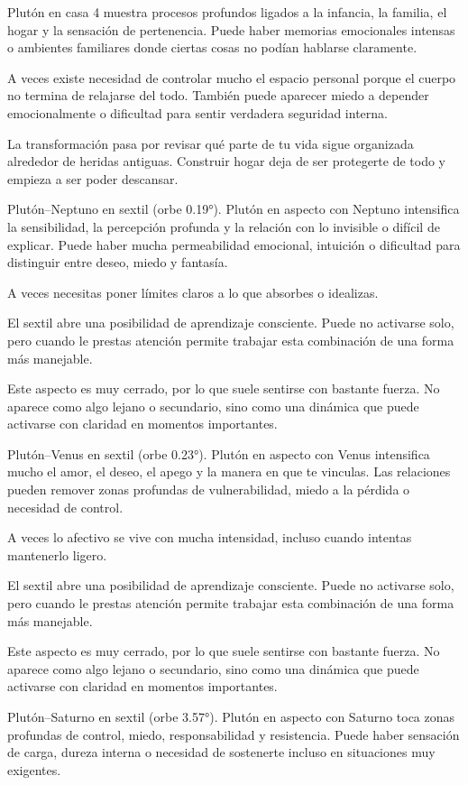 \documentclass[11pt,a4paper]{article}
\begin{document}
Plutón en casa 4 muestra procesos profundos ligados a la infancia, la familia, el hogar y la sensación de pertenencia. Puede haber memorias emocionales intensas o ambientes familiares donde ciertas cosas no podían hablarse claramente.

A veces existe necesidad de controlar mucho el espacio personal porque el cuerpo no termina de relajarse del todo. También puede aparecer miedo a depender emocionalmente o dificultad para sentir verdadera seguridad interna.

La transformación pasa por revisar qué parte de tu vida sigue organizada alrededor de heridas antiguas. Construir hogar deja de ser protegerte de todo y empieza a ser poder descansar.

Plutón–Neptuno en sextil (orbe 0.19°).
Plutón en aspecto con Neptuno intensifica la sensibilidad, la percepción profunda y la relación con lo invisible o difícil de explicar. Puede haber mucha permeabilidad emocional, intuición o dificultad para distinguir entre deseo, miedo y fantasía.

A veces necesitas poner límites claros a lo que absorbes o idealizas.

El sextil abre una posibilidad de aprendizaje consciente. Puede no activarse solo, pero cuando le prestas atención permite trabajar esta combinación de una forma más manejable.

Este aspecto es muy cerrado, por lo que suele sentirse con bastante fuerza. No aparece como algo lejano o secundario, sino como una dinámica que puede activarse con claridad en momentos importantes.

Plutón–Venus en sextil (orbe 0.23°).
Plutón en aspecto con Venus intensifica mucho el amor, el deseo, el apego y la manera en que te vinculas. Las relaciones pueden remover zonas profundas de vulnerabilidad, miedo a la pérdida o necesidad de control.

A veces lo afectivo se vive con mucha intensidad, incluso cuando intentas mantenerlo ligero.

El sextil abre una posibilidad de aprendizaje consciente. Puede no activarse solo, pero cuando le prestas atención permite trabajar esta combinación de una forma más manejable.

Este aspecto es muy cerrado, por lo que suele sentirse con bastante fuerza. No aparece como algo lejano o secundario, sino como una dinámica que puede activarse con claridad en momentos importantes.

Plutón–Saturno en sextil (orbe 3.57°).
Plutón en aspecto con Saturno toca zonas profundas de control, miedo, responsabilidad y resistencia. Puede haber sensación de carga, dureza interna o necesidad de sostenerte incluso en situaciones muy exigentes.
\end{document}
